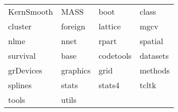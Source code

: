 \begin{tabular}{llll} 
KernSmooth & MASS & boot & class\\ 
cluster & foreign & lattice & mgcv\\ 
nlme & nnet & rpart & spatial\\ 
survival & base & codetools & datasets\\ 
grDevices & graphics & grid & methods\\ 
splines & stats & stats4 & tcltk\\ 
tools  &  utils  &   &   \\ 
\end{tabular}

